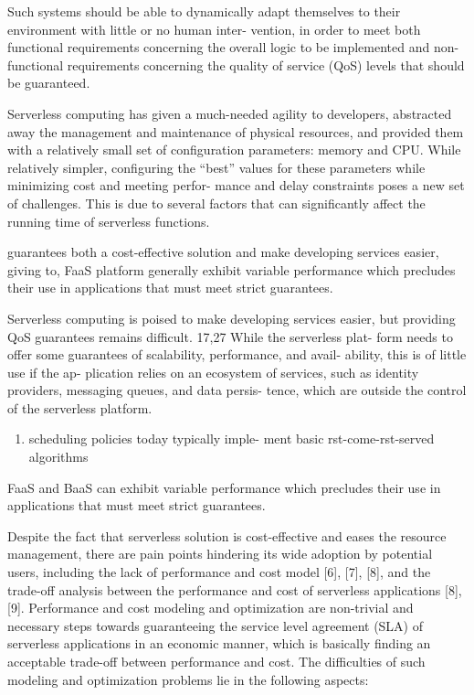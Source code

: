 \documentclass[12pt,a4paper]{report}
\begin{document}
 Such
systems should be able to dynamically adapt themselves
to their environment with little or no human inter-
vention, in order to meet both functional requirements
concerning the overall logic to be implemented and non-
functional requirements concerning the quality of service
(QoS) levels that should be guaranteed.




Serverless computing has given a much-needed agility to
developers, abstracted away the management and maintenance
of physical resources, and provided them with a relatively
small set of configuration parameters: memory and CPU.
While relatively simpler, configuring the “best” values for
these parameters while minimizing cost and meeting perfor-
mance and delay constraints poses a new set of challenges.
This is due to several factors that can significantly affect the
running time of serverless functions.




guarantees both a cost-effective solution and make developing services easier, giving to, FaaS platform generally exhibit variable performance which precludes their use in applications that must meet strict guarantees.
 
 
 Serverless computing is poised to
 make developing services easier, but
 providing QoS guarantees remains
 difficult. 17,27 While the serverless plat-
 form needs to offer some guarantees
 of scalability, performance, and avail-
 ability, this is of little use if the ap-
 plication relies on an ecosystem of
 services, such as identity providers,
 messaging queues, and data persis-
 tence, which are outside the control
 of the serverless platform.
 
 
 
 
 
\begin{enumerate}
	\item scheduling policies today typically imple-
	ment basic rst-come-rst-served algorithms
\end{enumerate}




FaaS and BaaS can exhibit variable
performance which precludes their
use in applications that must meet
strict guarantees.



Despite the fact that serverless solution is cost-effective
and eases the resource management, there are pain points
hindering its wide adoption by potential users, including
the lack of performance and cost model [6], [7], [8], and
the trade-off analysis between the performance and cost
of serverless applications [8], [9]. Performance and cost
modeling and optimization are non-trivial and necessary
steps towards guaranteeing the service level agreement
(SLA) of serverless applications in an economic manner,
which is basically finding an acceptable trade-off between
performance and cost. The difficulties of such modeling and
optimization problems lie in the following aspects:
\end{document}
